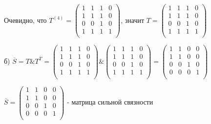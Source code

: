 \documentclass{article}
\begin{document}
\vspace{5mm}
\newpage
\hspace{8mm} Очевидно, что $T^{(4)} = 
\begin{pmatrix}
	1 & 1 & 1 & 0\\
	1 & 1 & 1 & 0\\
	0 & 0 & 1 & 0\\
	1 & 1 & 1 & 1\\
\end{pmatrix}$, значит $T = 
\begin{pmatrix}
    1 & 1 & 1 & 0\\
	1 & 1 & 1 & 0\\
	0 & 0 & 1 & 0\\
	1 & 1 & 1 & 1\\
\end{pmatrix}$
\vspace{5mm}
\par
б) $\overline{S} = T \& T^T = \begin{pmatrix}
	1 & 1 & 1 & 0\\
	1 & 1 & 1 & 0\\
	0 & 0 & 1 & 0\\
	1 & 1 & 1 & 1\\
\end{pmatrix} \& 
\begin{pmatrix}
	1 & 1 & 1 & 0\\
	1 & 1 & 1 & 0\\
	0 & 0 & 1 & 0\\
	1 & 1 & 1 & 1\\
\end{pmatrix} = 
\begin{pmatrix}
	1 & 1 & 0 & 0\\
	1 & 1 & 0 & 0\\
	0 & 0 & 1 & 0\\
	0 & 0 & 0 & 1\\
\end{pmatrix}$
\vspace{5mm}
\par
\hspace{5mm}$\overline{S} = \begin{pmatrix}
	1 & 1 & 0 & 0\\
	1 & 1 & 0 & 0\\
	0 & 0 & 1 & 0\\
	0 & 0 & 0 & 1\\
\end{pmatrix}$ - матрица сильной связности
\vspace{5mm}
\par
\end{document}
